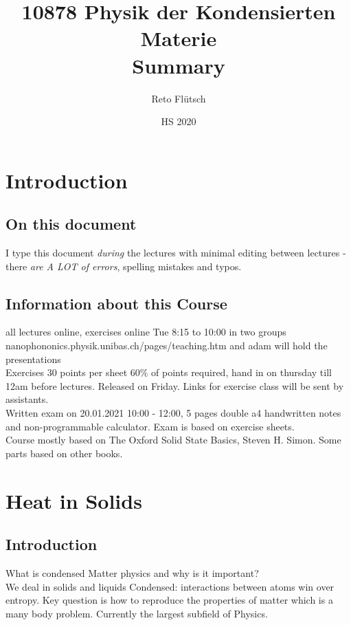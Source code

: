 \documentclass{report}
\title{10878 Physik der Kondensierten Materie\\
        \large Summary
        }
\author{Reto Flütsch}
\date{HS 2020}
\begin{document}
\maketitle
    
\chapter*{Introduction}
\section*{On this document}
I type this document \emph{during} the lectures with minimal editing between lectures - there \emph{are A LOT of errors}, spelling mistakes and typos. 
\section*{Information about this Course}
all lectures online, exercises online Tue 8:15 to 10:00 in two groups\\
nanophononics.physik.unibas.ch/pages/teaching.htm and adam will hold the presentations\\
Exercises 30 points per sheet 60\% of points required, hand in on thursday till 12am before lectures. Released on Friday. Links for exercise class will be sent by assistants.\\

Written exam on 20.01.2021 10:00 - 12:00, 5 pages double a4 handwritten notes and non-programmable calculator. Exam is based on exercise sheets. \\

Course mostly based on The Oxford Solid State Basics, Steven H. Simon. Some parts based on other books.


\tableofcontents
\newpage
\chapter{Heat in Solids}
\section{Introduction}
What is condensed Matter physics and why is it important? \\
We deal in solids and liquids Condensed: interactions between atoms win over entropy. Key question is how to reproduce the properties of matter which is a many body problem. Currently the largest subfield of Physics.\\
\end{document}
